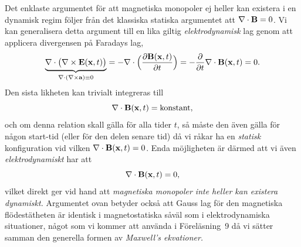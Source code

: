 {{{{{Det enklaste argumentet f{\"o}r att magnetiska monopoler ej heller kan existera
i en dynamisk regim f{\"o}ljer fr{\aa}n det klassiska statiska argumentet att
$\nabla\cdot{\bf B}=0$. Vi kan generalisera detta argument till en lika giltig
{\it elektrodynamisk} lag genom att applicera divergensen p{\aa} Faradays
lag,
$$
  \underbrace{
    \nabla\cdot\big(\nabla\times{\bf E}({\bf x},t)\big)
  }_{\nabla\cdot(\nabla\times{\bf a})\equiv0}
  =-\nabla\cdot\Big({{\partial{\bf B}({\bf x},t)}\over{\partial t}}\Big)
  =-{{\partial}\over{\partial t}}\nabla\cdot{\bf B}({\bf x},t)
  =0.
$$
Den sista likheten kan trivialt integreras till
$$
  \nabla\cdot{\bf B}({\bf x},t)=\hbox{konstant},
$$
och om denna relation skall g{\"a}lla f{\"o}r alla tider $t$, s{\aa} m{\aa}ste
den {\"a}ven g{\"a}lla f{\"o}r n{\aa}gon start-tid (eller f{\"o}r den delen
senare tid) d{\aa} vi r{\aa}kar ha en {\it statisk} konfiguration vid vilken
$\nabla\cdot{\bf B}({\bf x},t)=0$. Enda m{\"o}jligheten {\"a}r d{\"a}rmed att
vi {\"a}ven {\it elektrodynamiskt} har att
$$
  \nabla\cdot{\bf B}({\bf x},t)=0,
$$
vilket direkt ger vid hand att {\it magnetiska monopoler inte heller kan
existera  dynamiskt.} Argumentet ovan betyder ocks{\aa} att Gauss lag f{\"o}r
den magnetiska fl{\"o}dest{\"a}theten {\"a}r identisk i magnetostatiska
s{\aa}v{\"a}l som i elektrodynamiska situationer, n{\aa}got som vi kommer att
anv{\"a}nda i F{\"o}rel{\"a}sning~9 d{\aa} vi s{\"a}tter samman den generella
formen av {\it Maxwell's ekvationer.}
\vfill\eject

}}}}}
